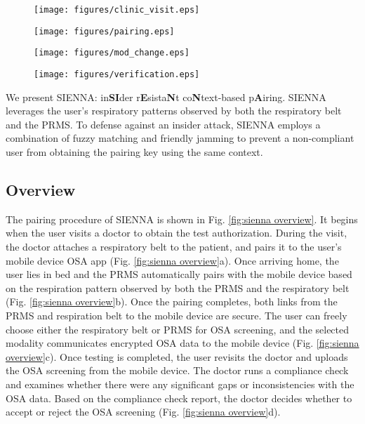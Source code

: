 \begin{figure*}[t]
\begin{subfigure}[t]{0.24\textwidth}
\texttt{[image: figures/clinic\_visit.eps]}
\end{subfigure}
\hspace{\fill}
\begin{subfigure}[t]{0.24\textwidth}
\texttt{[image: figures/pairing.eps]}
\end{subfigure}
\hspace{\fill}
\begin{subfigure}[t]{0.24\textwidth}
\texttt{[image: figures/mod\_change.eps]}
\end{subfigure}
\hspace{\fill}
\begin{subfigure}[t]{0.24\textwidth}
\texttt{[image: figures/verification.eps]}
\end{subfigure}
\caption{Left to right: (a) In hospital: a medical technician places a respiratory belt on a user and pairs it with the user's phone; (b) At home: a user pairs the PRMS with the user's phone; (c) User switches to PRMS for OSA screening; (e) Doctor verifies OSA data for any abnormalities.}
\label{fig:sienna overview}
\end{figure*}

We present SIENNA: in\textbf{SI}der r\textbf{E}sista\textbf{N}t co\textbf{N}text-based p\textbf{A}iring. SIENNA leverages the user's respiratory patterns observed by both the respiratory belt and the PRMS. To defense against an insider attack, SIENNA employs a combination of fuzzy matching and friendly jamming to prevent a non-compliant user from obtaining the pairing key using the same context.

\subsection{Overview}
The pairing procedure of SIENNA is shown in Fig. \ref{fig:sienna overview}. It begins when the user visits a doctor to obtain the test authorization. During the visit, the doctor attaches a respiratory belt to the patient, and pairs it to the user's mobile device OSA app (Fig. \ref{fig:sienna overview}a). Once arriving home, the user lies in bed and the PRMS automatically pairs with the mobile device based on the respiration pattern observed by both the PRMS and the respiratory belt (Fig. \ref{fig:sienna overview}b). Once the pairing completes, both links from the PRMS and respiration belt to the mobile device are secure. The user can freely choose either the respiratory belt or PRMS for OSA screening, and the selected modality communicates encrypted OSA data to the mobile device (Fig. \ref{fig:sienna overview}c). Once testing is completed, the user revisits the doctor and uploads the OSA screening from the mobile device. The doctor runs a compliance check and examines whether there were any significant gaps or inconsistencies with the OSA data. Based on the compliance check report, the doctor decides whether to accept or reject the OSA screening (Fig. \ref{fig:sienna overview}d).

